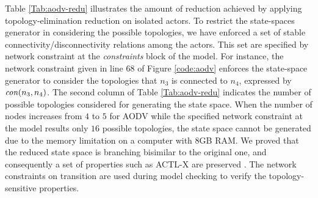 %
Table \ref{Tab:aodv-redu} illustrates the amount of reduction achieved by applying topology-elimination reduction on isolated actors. To restrict the state-spaces generator in considering the possible topologies, we have enforced a set of stable connectivity/disconnectivity relations among the actors. This set are specified by network constraint at the \emph{constraints} block of the model. For instance, the network constraint given in line $68$ of Figure \ref{code:aodv} enforces the state-space generator to consider the topologies that $n_3$ is connected to $n_4$, expressed by ${\it con}(n_3,n_4)$. The second column of Table \ref{Tab:aodv-redu} indicates the number of possible topologies considered for generating the state space. When the number of nodes increases from $4$ to $5$ for AODV while the specified network constraint at the model results only $16$ possible topologies, the state space cannot be generated due to the memory limitation on a computer with $8${GB} {RAM}.  We proved that the reduced state space is branching bisimilar to the
original one, and consequently a set of properties such as {ACTL-X} are preserved \cite{FOAC}. The network constraints on transition are used during model checking \cite{FORM,CSI2018} to verify the topology-sensitive properties. 



